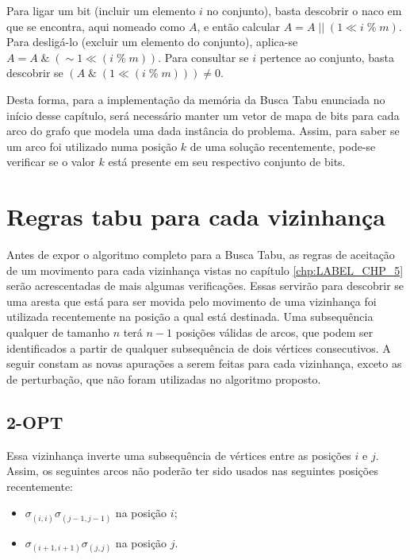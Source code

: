 \par Para ligar um bit (incluir um elemento $i$ no conjunto), basta descobrir o naco em que se encontra, aqui nomeado como $A$, e então calcular $A = A \;||\; (1 \ll i \;\%\; m)$. Para desligá-lo (excluir um elemento do conjunto), aplica-se $A = A \;\&\; (\sim 1 \ll (i \;\%\; m))$. Para consultar se $i$ pertence ao conjunto, basta descobrir se $(A \;\&\; ( 1 \ll (i \;\%\; m))) \neq 0$.

\par Desta forma, para a implementação da memória da Busca Tabu enunciada no início desse capítulo, será necessário manter um vetor de mapa de bits para cada arco do grafo que modela uma dada instância do problema. Assim, para saber se um arco foi utilizado numa posição $k$ de uma solução recentemente, pode-se verificar se o valor $k$ está presente em seu respectivo conjunto de bits.

\section{Regras tabu para cada vizinhança}\label{sec:LABEL_CHP_6_SEC_C}

\par Antes de expor o algoritmo completo para a Busca Tabu, as regras de aceitação de um movimento para cada vizinhança vistas no capítulo \ref{chp:LABEL_CHP_5} serão acrescentadas de mais algumas verificações. Essas servirão para descobrir se uma aresta que está para ser movida pelo movimento de uma vizinhança foi utilizada recentemente na posição a qual está destinada. Uma subsequência qualquer de tamanho $n$ terá $n-1$ posições válidas de arcos, que podem ser identificados a partir de qualquer subsequência de dois vértices consecutivos. A seguir constam as novas apurações a serem feitas para cada vizinhança, exceto as de perturbação, que não foram utilizadas no algoritmo proposto.


\subsection{2-OPT}\label{sec:LABEL_CHP_5_SUBSEC_A}

\par Essa vizinhança inverte uma subsequência de vértices entre as posições $i$ e $j$.  Assim, os seguintes arcos não poderão ter sido usados nas seguintes posições recentemente:

	\begin{itemize}
        \item $\sigma_{(i, i)}\sigma_{(j-1, j-1)}$ na posição $i$;
        \item $\sigma_{(i+1, i+1)}\sigma_{(j, j)}$ na posição $j$.
    \end{itemize}
    
